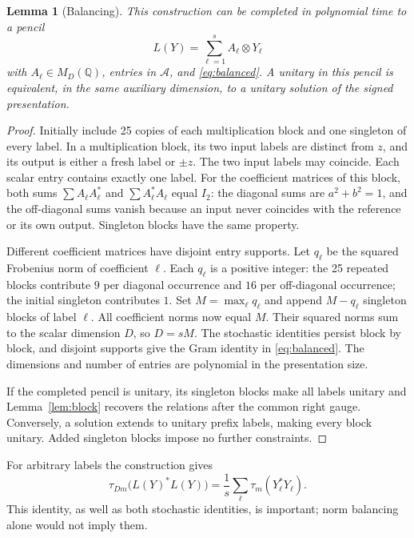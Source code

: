 \documentclass[11pt]{article}
\newtheorem{lemma}[theorem]{Lemma}
\newcommand{\Q}{\mathbb Q}
\begin{document}
\begin{lemma}[Balancing]\label{lem:balance}
This construction can be completed in polynomial time to a pencil
\[
 L(Y)=\sum_{\ell=1}^s A_\ell\otimes Y_\ell
\]
with $A_\ell\in M_D(\Q)$, entries in $\mathcal A$, and \eqref{eq:balanced}. A unitary in this pencil is equivalent, in the same auxiliary dimension, to a unitary solution of the signed presentation.
\end{lemma}
\begin{proof}
Initially include 25 copies of each multiplication block and one singleton of every label. In a multiplication block, its two input labels are distinct from $z$, and its output is either a fresh label or $\pm z$. The two input labels may coincide. Each scalar entry contains exactly one label. For the coefficient matrices of this block, both sums $\sum A_\ell A_\ell^*$ and $\sum A_\ell^*A_\ell$ equal $I_2$: the diagonal sums are $a^2+b^2=1$, and the off-diagonal sums vanish because an input never coincides with the reference or its own output. Singleton blocks have the same property.

Different coefficient matrices have disjoint entry supports. Let $q_\ell$ be the squared Frobenius norm of coefficient $\ell$. Each $q_\ell$ is a positive integer: the 25 repeated blocks contribute $9$ per diagonal occurrence and $16$ per off-diagonal occurrence; the initial singleton contributes $1$. Set $M=\max_\ell q_\ell$ and append $M-q_\ell$ singleton blocks of label $\ell$. All coefficient norms now equal $M$. Their squared norms sum to the scalar dimension $D$, so $D=sM$. The stochastic identities persist block by block, and disjoint supports give the Gram identity in \eqref{eq:balanced}. The dimensions and number of entries are polynomial in the presentation size.

If the completed pencil is unitary, its singleton blocks make all labels unitary and Lemma~\ref{lem:block} recovers the relations after the common right gauge. Conversely, a solution extends to unitary prefix labels, making every block unitary. Added singleton blocks impose no further constraints.
\end{proof}
For arbitrary labels the construction gives
\begin{equation}
 \tau_{Dm}\bigl(L(Y)^*L(Y)\bigr)
 =\frac1s\sum_\ell\tau_m(Y_\ell^*Y_\ell). \label{eq:gram}
\end{equation}
This identity, as well as both stochastic identities, is important; norm balancing alone would not imply them.
\end{document}
